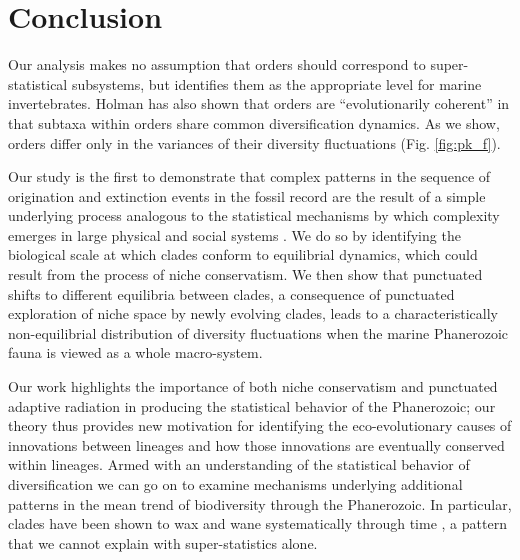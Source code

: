 \documentclass[11pt]{article}
\begin{document}
\section{Conclusion}

Our analysis makes no assumption that orders should correspond to
super-statistical subsystems, but identifies them as the appropriate
level for marine invertebrates. Holman \citep{holman1989} has also
shown that orders are ``evolutionarily coherent'' in that subtaxa
within orders share common diversification dynamics. As we show,
orders differ only in the variances of their diversity fluctuations
(Fig. \ref{fig:pk_f}).

Our study is the first to demonstrate that complex patterns in the
sequence of origination and extinction events in the fossil record are
the result of a simple underlying process analogous to the statistical
mechanisms by which complexity emerges in large physical
\citep{beck2004} and social systems \citep{fuentes2009}.  We do so by
identifying the biological scale at which clades conform to
equilibrial dynamics, which could result from the process of niche
conservatism. We then show that punctuated shifts to different
equilibria between clades, a consequence of punctuated exploration of
niche space by newly evolving clades, leads to a characteristically
non-equilibrial distribution of diversity fluctuations when the marine
Phanerozoic fauna is viewed as a whole macro-system.

Our work highlights the importance of both niche conservatism and
punctuated adaptive radiation in producing the statistical behavior of
the Phanerozoic; our theory thus provides new motivation for
identifying the eco-evolutionary causes of innovations between
lineages and how those innovations are eventually conserved within
lineages. Armed with an understanding of the statistical behavior of
diversification we can go on to examine mechanisms underlying
additional patterns in the mean trend of biodiversity through the
Phanerozoic. In particular, clades have been shown to wax and wane
systematically through time \citep{liow2007,
  quental2013}, a pattern that we cannot explain with super-statistics
alone.

\end{document}
